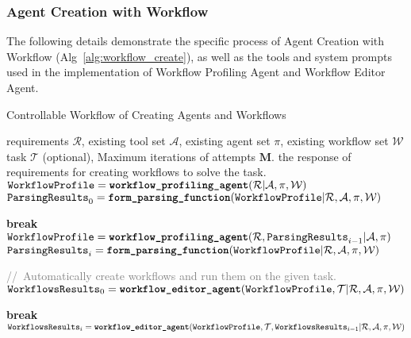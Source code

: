 \subsubsection{Agent Creation with Workflow}\label{sec:workflow_app}
The following details demonstrate the specific process of Agent Creation with Workflow (Alg~\ref{alg:workflow_create}), as well as the tools and system prompts used in the implementation of Workflow Profiling Agent and Workflow Editor Agent.
\begin{breakablealgorithm}
   \caption{Controllable Workflow of Creating Agents and Workflows }
   \label{alg:workflow_create}
\begin{algorithmic}[1]
    requirements $\mathcal{R}$, existing tool set $\mathcal{A}$, existing agent set $\mathcal{\pi}$, existing workflow set $\mathcal{W}$ task $\mathcal{T}$ (optional), Maximum iterations of attempts $\mathbf{M}$.
    the response of requirements for creating workflows to solve the task.
   \STATE $\texttt{WorkflowProfile} = \textbf{\texttt{workflow\_profiling\_agent}}(\mathcal{R}| \mathcal{A}, \mathcal{\pi}, \mathcal{W})$
   \STATE $\texttt{ParsingResults}_0  = \textbf{\texttt{form\_parsing\_function}}(\texttt{WorkflowProfile}| \mathcal{R}, \mathcal{A}, \mathcal{\pi}, \mathcal{W})$
   
   \STATE \textbf{break} 
   \ELSE
   \STATE $\texttt{WorkflowProfile} = \textbf{\texttt{workflow\_profiling\_agent}}(\mathcal{R}, \texttt{ParsingResults}_{i-1}| \mathcal{A}, \mathcal{\pi})$
   \STATE $\texttt{ParsingResults}_i  = \textbf{\texttt{form\_parsing\_function}}(\texttt{WorkflowProfile}| \mathcal{R}, \mathcal{A}, \mathcal{\pi}, \mathcal{W})$
   \ENDIF
   \ENDFOR

    \STATE \textcolor{gray}{//~Automatically create workflows and run them on the given task.}
   \STATE $\texttt{WorkflowsResults}_0 = \textbf{\texttt{workflow\_editor\_agent}}(\texttt{WorkflowProfile}, \mathcal{T}| \mathcal{R}, \mathcal{A}, \mathcal{\pi}, \mathcal{W})$ 
   
   
   \STATE \textbf{break} 
   \ELSE
   \STATE $\texttt{WorkflowsResults}_i = \textbf{\texttt{workflow\_editor\_agent}}(\texttt{WorkflowProfile}, \mathcal{T}, \texttt{WorkflowsResults}_{i-1}| \mathcal{R}, \mathcal{A}, \mathcal{\pi}, \mathcal{W})$ 
   \ENDIF
   \ENDFOR
\end{algorithmic}
\end{breakablealgorithm}
